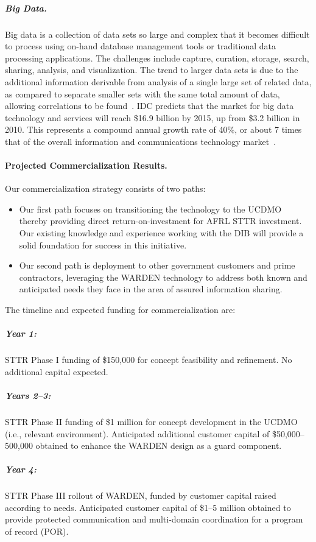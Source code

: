 \documentclass{sbir}
\begin{document}
\vspace{-12pt}
\subparagraph{Big Data.} Big data is a collection of data sets so large and complex that it becomes difficult to process using on-hand database management tools or traditional data processing applications. The challenges include capture, curation, storage, search, sharing, analysis, and visualization. The trend to larger data sets is due to the additional information derivable from analysis of a single large set of related data, as compared to separate smaller sets with the same total amount of data, allowing correlations to be found~\cite{WikipediaBig:13}.
IDC predicts that the market for big data technology and services will reach \$16.9 billion by 2015, up from \$3.2 billion in 2010. This represents a compound annual growth rate of 40\%, or about 7 times that of the overall information and communications technology market~\cite{IDCBig:13}.

\paragraph{Projected Commercialization Results.} Our commercialization strategy consists of two paths:
\begin{itemize}
  \item Our first path focuses on transitioning the technology to the UCDMO thereby providing direct return-on-investment for AFRL STTR investment. Our existing knowledge and experience working with the DIB will provide a solid foundation for success in this initiative.
  \item Our second path is deployment to other government customers and prime contractors, leveraging the WARDEN technology to address both known and anticipated needs they face in the area of assured information sharing.
\end{itemize}
The timeline and expected funding for commercialization are:
\vspace{-12pt}
\subparagraph{Year 1:} STTR Phase I funding of \$150,000 for concept feasibility and refinement. No additional capital expected.
\vspace{-12pt}
\subparagraph{Years 2--3:} STTR Phase II funding of \$1 million for concept development in the UCDMO (i.e., relevant environment). Anticipated additional customer capital of \$50,000--500,000 obtained to enhance the WARDEN design as a guard component.
\vspace{-12pt}
\subparagraph{Year 4:} STTR Phase III rollout of WARDEN, funded by customer capital raised according to needs. Anticipated customer capital of \$1--5 million obtained to provide protected communication and multi-domain coordination for a program of record (POR).
\end{document}
